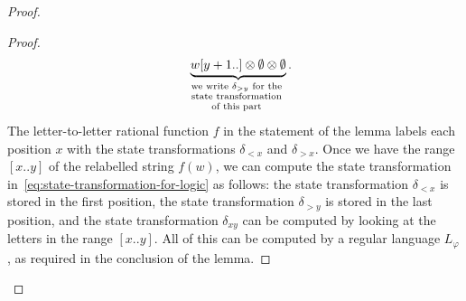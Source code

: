 \begin{proof}
\begin{proof}
\begin{align*}
        \quad 
        \myunderbrace{w[y+1..] \otimes \emptyset \otimes \emptyset}{we write $\delta_{>y}$ for the \\  state transformation \\ of this part}.
        \end{align*}
        The letter-to-letter rational function $f$ in the statement of the lemma labels each position $x$ with the state transformations $\delta_{<x}$ and $\delta_{>x}$. Once we have the range $[x..y]$ of the relabelled string $f(w)$, we can compute the state transformation in~\eqref{eq:state-transformation-for-logic} as follows: the state transformation $\delta_{<x}$ is stored in the first position, the state transformation $\delta_{>y}$ is stored in the last position, and the state transformation $\delta_{xy}$ can be computed by looking at the letters in the range $[x..y]$. All of this can be computed by a regular language $L_\varphi$, as required in the conclusion of the lemma.
    \end{proof}


\end{proof}

